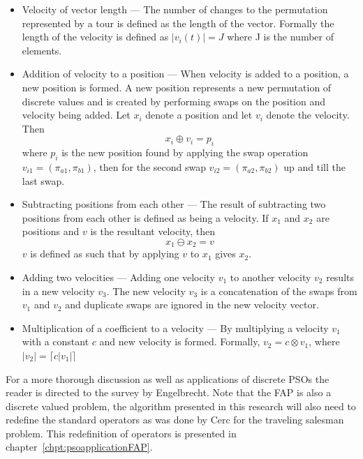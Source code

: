\begin{itemize}
\item{Velocity of vector length} --- The number of changes to the permutation represented by a tour is defined as the length of the vector\cite{FundamentalSwarm}. Formally the length of the velocity is defined as $|v_i(t)|=J$ where J is the number of elements.
\item{Addition of velocity to a position} --- When velocity is added to a position, a new position is formed\cite{FundamentalSwarm}. A new position represents a new permutation of discrete values and is created by performing swaps on the position and velocity being added\cite{FundamentalSwarm}. Let $x_i$ denote a position and let $v_i$ denote the velocity\cite{FundamentalSwarm}. Then
\begin{equation}
    x_i \oplus v_i = p_i
\end{equation}
where $p_i$ is the new position found by applying the swap operation $v_{i1} = (\pi_{a1},\pi_{b1})$, then for the second swap $v_{i2} = (\pi_{a2},\pi_{b2})$ up and till the last swap\cite{FundamentalSwarm}.
\item{Subtracting positions from each other}  --- The result of subtracting two positions from each other is defined as being a velocity\cite{FundamentalSwarm}. If $x_1$ and $x_2$ are positions and $v$ is the resultant velocity, then
\begin{equation}
x_1 \ominus x_2 = v
\end{equation}
$v$ is defined as such that by applying $v$ to $x_1$ gives $x_2$\cite{FundamentalSwarm}.
\item{Adding two velocities} --- Adding one velocity $v_1$ to another velocity $v_2$ results in a new velocity $v_3$\cite{FundamentalSwarm}. The new velocity $v_3$ is a concatenation of the swaps from $v_1$ and $v_2$ and duplicate swaps are ignored in the new velocity vector\cite{FundamentalSwarm}.
\item{Multiplication of a coefficient to a velocity} --- By multiplying a velocity $v_1$ with a constant $c$ and new velocity is formed. Formally, $v_2 = c \otimes v_1$, where $|v_2| = \lceil c|v_1|\rceil$\cite{FundamentalSwarm}
\end{itemize}

For a more thorough discussion as well as applications of discrete \glspl{PSO} the reader is directed to the survey by Engelbrecht\cite{FundamentalSwarm}. Note that the \gls{FAP} is also a discrete valued problem, the algorithm presented in this research will also need to redefine the standard operators as was done by Cerc for the traveling salesman problem. This redefinition of operators is presented in chapter~\ref{chpt:psoapplicationFAP}.

